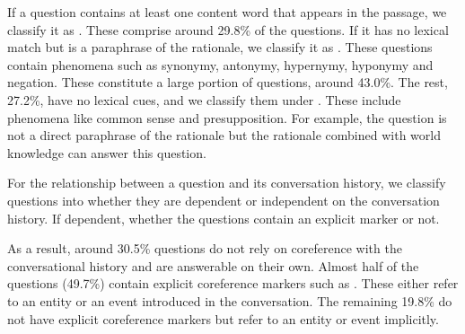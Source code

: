 If a question contains at least one content word that appears in the passage, we classify it as . These comprise around 29.8\% of the questions. If it has no lexical match but is a paraphrase of the rationale, we classify it as . These questions contain phenomena such as synonymy, antonymy, hypernymy, hyponymy and negation.
These constitute a large portion of questions, around 43.0\%. The rest, 27.2\%, have no lexical cues, and we classify them under . These include phenomena like common sense and presupposition. For example, the question  is not a direct paraphrase of the rationale  but the rationale combined with world knowledge can answer this question.

For the relationship between a question and its conversation history, we classify questions into whether they are dependent or independent on the conversation history. If dependent, whether the questions contain an explicit marker or not.

As a result, around 30.5\% questions do not rely on coreference with the conversational history and are answerable on their own. Almost half of the questions (49.7\%) contain explicit coreference markers such as . These either refer to an entity or an event introduced in the conversation.
The remaining 19.8\% do not have explicit coreference markers but refer to an entity or event implicitly.
